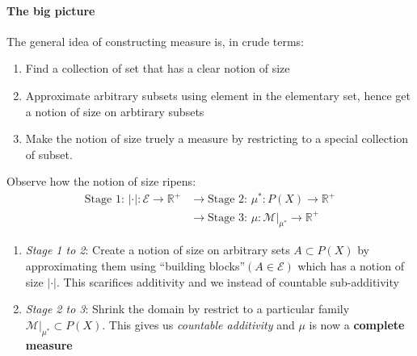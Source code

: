 \paragraph{The big picture}

The general idea of constructing measure is, in crude terms:

\begin{enumerate}
\item Find a collection of set that has a clear notion of size
\item Approximate arbitrary subsets using element in the elementary set, hence get a notion of size on arbtirary subsets
\item Make the notion of size truely a measure by restricting to a special collection of subset.
\end{enumerate}

Observe how the notion of size ripens:
\begin{equation}
\label{workflow_from_elementary_set}
\begin{aligned}
\text{Stage 1: $\boxed{|\cdot|:\mathcal E \to \mathbb{R}^+}$} 
&\longrightarrow \text{Stage 2: $\boxed{\mu^* : P(X)\to \mathbb{R}^+}$} \\ 
&\longrightarrow \text{Stage 3: $\boxed{\mu: \mathcal M|_{\mu^*} \to \mathbb{R}^{+}}$}
\end{aligned}
\end{equation}
\begin{enumerate}
\item \textit{Stage 1 to 2}: Create a notion of size on arbitrary sets $A\subset P(X)$ by approximating them using ``building blocks''$(A\in \mathcal E)$ which has a notion of size $|\cdot |$. This scarifices additivity and we instead of countable sub-additivity
\item \textit{Stage 2 to 3}: Shrink the domain by restrict to a particular family $\mathcal M |_{\mu^*}\subset P(X)$. This gives us \textit{countable additivity} and $\mu$ is now a \textbf{complete measure}
\end{enumerate}

